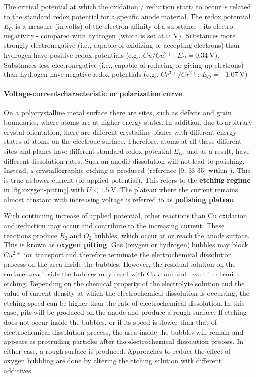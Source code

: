 The critical potential at which the oxidation / reduction starts to occur is related to the standard redox potential for a specific anode material. The redox potential $E_O$ is a measure (in volts) of the electron affinity of a substance - its electro negativity - compared with hydrogen (which is set at \SI{0}{\volt}). Substances more strongly electronegative (i.e., capable of oxidizing or accepting electrons) than hydrogen have positive redox potentials (e.g., $Cu/Cu^{2+}$: $E_O = \SI{0.34}{\volt}$). Substances less electronegative (i.e., capable of reducing or giving up electrons) than hydrogen have negative redox potentials (e.g., $Cr^{3+}/Cr^{2+}$: $E_O = \SI{-1.07}{\volt}$)\cite{jinshan_electrochemical_2004}

\paragraph{Voltage-current-characteristic or polarization curve}
On a polycrystalline metal surface there are sites, such as defects and grain boundaries, where atoms are at higher energy states. In addition, due to arbitrary crystal orientation, there are different crystalline planes with different energy states of atoms on the electrode surface. Therefore, atoms at all these different sites and planes have different standard redox potential $E_O$, and as a result, have different dissolution rates.
Such an anodic dissolution will not lead to polishing. Instead, a crystallographic etching is produced (reference [9, 33-35] within \cite{jinshan_electrochemical_2004}). This is true at lower current (or applied potential). This refers to the \textbf{etching regime} in \autoref{fig:oxygen-pitting} with $U<\SI{1.5}{\volt}$.
The plateau where the current remains almost constant with increasing voltage is referred to as \textbf{polishing plateau}. 
		
With continuing increase of applied potential, other reactions than Cu oxidation and reduction may occur and contribute to the increasing current. These reactions produce $H_2$ and $O_2$ bubbles, which occur at or reach the anode surface. This is known as \textbf{oxygen pitting}. Gas (oxygen or hydrogen) bubbles may block $Cu^{2+}$ ion transport and therefore terminate the electrochemical dissolution process on the area inside the bubbles. However, the residual solution on the surface area inside the bubbles may react with Cu atom and result in chemical etching. Depending on the chemical property of the electrolyte solution and the value of current density at which the electrochemical dissolution is occurring, the etching speed can be higher than the rate of electrochemical dissolution. In this case, pits will be produced on the anode and produce a rough surface. If etching does not occur inside the bubbles, or if its speed is slower than that of electrochemical dissolution process, the area inside the bubbles will remain and appears as protruding particles after the electrochemical dissolution process. In either case, a rough surface is produced. Approaches to reduce the effect of oxygen bubbling are done by altering the etching solution with different additives.

